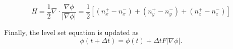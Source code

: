 \begin{equation}
H = \frac{1}{2}\nabla \cdot \frac{\nabla \phi}{|\nabla \phi|} = \frac{1}{2}[(n_x^+ - n_x^-) + (n_y^+ - n_y^-) + (n_z^+ - n_z^-)]
\label{meanCurvature}
\end{equation}

Finally, the level set equation is updated as
\begin{equation}
\phi(t + \Delta t) = \phi(t) + \Delta tF|\nabla \phi|.
\end{equation}